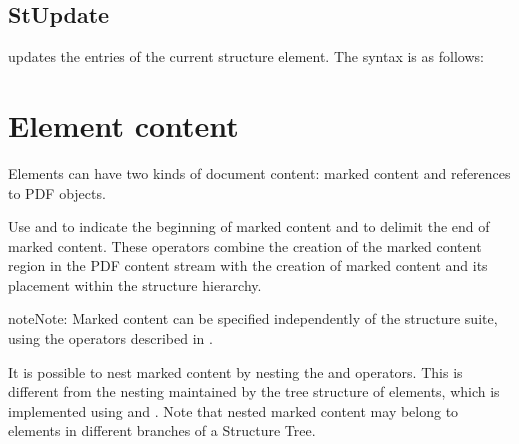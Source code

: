 \documentclass[letterpaper,12pt,english,openany,oneside]{sphinxmanual}
\begin{document}
\begin{sphinxVerbatim}[commandchars=\\\{\}]
\PYG{p}{[}  
\end{sphinxVerbatim}


\subsection{StUpdate}
\label{\detokenize{pdfmark_Logical:stupdate}}
 updates the entries of the current structure element. The syntax is as follows:

\begin{sphinxVerbatim}[commandchars=\\\{\}]
 \PYG{p}{[}   
 
   
\end{sphinxVerbatim}


\section{Element content}
\label{\detokenize{pdfmark_Logical:element-content}}
Elements can have two kinds of document content: marked content and references to PDF objects.

Use  and  to indicate the beginning of marked content and  to delimit the end of marked content. These operators combine the creation of the marked content region in the PDF content stream with the creation of marked content and its placement within the structure hierarchy.

\begin{sphinxadmonition}{note}{Note:}
Marked content can be specified independently of the structure suite, using the operators described in .
\end{sphinxadmonition}

It is possible to nest marked content by nesting the  and  operators. This is different from the nesting maintained by the tree structure of elements, which is implemented using  and  . Note that nested marked content may belong to elements in different branches of a Structure Tree.
\end{document}
